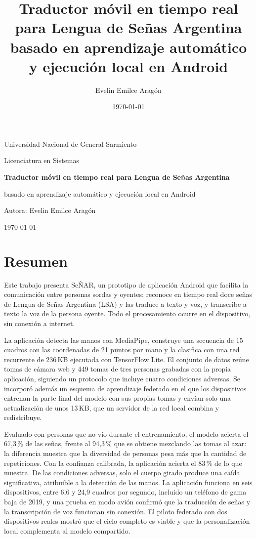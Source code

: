 \documentclass[12pt,a4paper,oneside]{report}
\title{Traductor móvil en tiempo real para Lengua de Señas Argentina basado en aprendizaje automático y ejecución local en Android}
\author{Evelin Emilce Aragón}
\date{\today}
\begin{document}
\begin{titlepage}
    \centering
    {\Large Universidad Nacional de General Sarmiento\par}
    \vspace{1.5cm}
    {\large Licenciatura en Sistemas\par}
    \vspace{2.5cm}
    {\Huge\bfseries Traductor móvil en tiempo real para Lengua de Señas Argentina\par}
    \vspace{0.4cm}
    {\Large basado en aprendizaje automático y ejecución local en Android\par}
    \vspace{2.5cm}
    {\large Autora: Evelin Emilce Aragón\par}
    \vspace{0.3cm}
    \vfill
    {\large \today\par}
\end{titlepage}


\chapter*{Resumen}
Este trabajo presenta SeÑAR, un prototipo de aplicación Android que facilita la comunicación entre personas sordas y oyentes: reconoce en tiempo real doce señas de Lengua de Señas Argentina (LSA) y las traduce a texto y voz, y transcribe a texto la voz de la persona oyente. Todo el procesamiento ocurre en el dispositivo, sin conexión a internet.

La aplicación detecta las manos con MediaPipe, construye una secuencia de 15 cuadros con las coordenadas de 21 puntos por mano y la clasifica con una red recurrente de 236\,KB ejecutada con TensorFlow Lite. El conjunto de datos reúne tomas de cámara web y 449 tomas de tres personas grabadas con la propia aplicación, siguiendo un protocolo que incluye cuatro condiciones adversas. Se incorporó además un esquema de aprendizaje federado en el que los dispositivos entrenan la parte final del modelo con sus propias tomas y envían solo una actualización de unos 13\,KB, que un servidor de la red local combina y redistribuye.

Evaluado con personas que no vio durante el entrenamiento, el modelo acierta el 67,3\,\% de las señas, frente al 94,3\,\% que se obtiene mezclando las tomas al azar: la diferencia muestra que la diversidad de personas pesa más que la cantidad de repeticiones. Con la confianza calibrada, la aplicación acierta el 83\,\% de lo que muestra. De las condiciones adversas, solo el cuerpo girado produce una caída significativa, atribuible a la detección de las manos. La aplicación funciona en seis dispositivos, entre 6,6 y 24,9 cuadros por segundo, incluido un teléfono de gama baja de 2019, y una prueba en modo avión confirmó que la traducción de señas y la transcripción de voz funcionan sin conexión. El piloto federado con dos dispositivos reales mostró que el ciclo completo es viable y que la personalización local complementa al modelo compartido.
\end{document}
